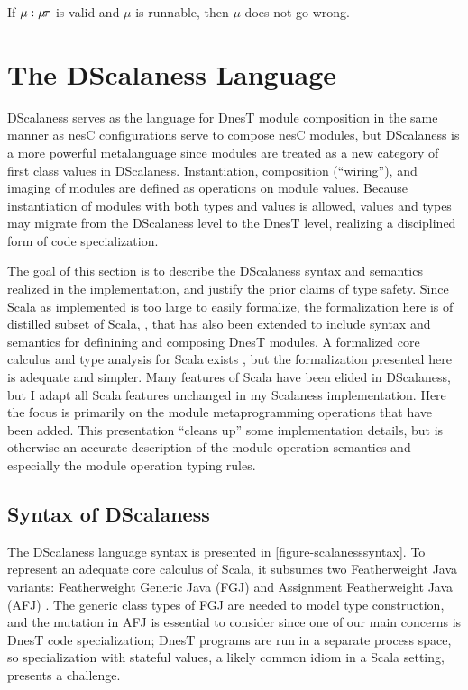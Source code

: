 \begin{conject}
  If $\mu : \mu\!\tau$ is valid and $\mu$ is runnable, then $\mu$ does not go wrong.
\end{conject}

\declmodtypingfig

\section{The DScalaness Language}
\label{section-scalaness-theory}

DScalaness serves as the language for DnesT module composition in the same manner as nesC
configurations serve to compose nesC modules, but DScalaness is a more powerful metalanguage
since modules are treated as a new category of first class values in DScalaness. Instantiation,
composition (``wiring''), and imaging of modules are defined as operations on module values.
Because instantiation of modules with both types and values is allowed, values and types may
migrate from the DScalaness level to the DnesT level, realizing a disciplined form of code
specialization.

The goal of this section is to describe the DScalaness syntax and semantics realized in the
implementation, and justify the prior claims of type safety. Since Scala as implemented is too
large to easily formalize, the formalization here is of distilled subset of Scala,
, that has also been extended to include syntax and semantics for definining
and composing DnesT modules. A formalized core calculus and type analysis for Scala exists
\cite{Cremet:2006:CCS:2135978.2135980}, but the formalization presented here is adequate and
simpler. Many features of Scala have been elided in DScalaness, but I adapt all Scala features
unchanged in my Scalaness implementation. Here the focus is primarily on the module
metaprogramming operations that have been added. This presentation ``cleans up'' some
implementation details, but is otherwise an accurate description of the module operation
semantics and especially the module operation typing rules.

\subsection{Syntax of DScalaness}

\scalanesssyntaxfig

The DScalaness language syntax is presented in \autoref{figure-scalanesssyntax}. To represent an
adequate core calculus of Scala, it subsumes two Featherweight Java variants: Featherweight
Generic Java (FGJ) \cite{FJ} and Assignment Featherweight Java (AFJ) \cite{AFJ}. The generic
class types of FGJ are needed to model type construction, and the mutation in AFJ is essential
to consider since one of our main concerns is DnesT code specialization; DnesT programs are run
in a separate process space, so specialization with stateful values, a likely common idiom in a
Scala setting, presents a challenge.

